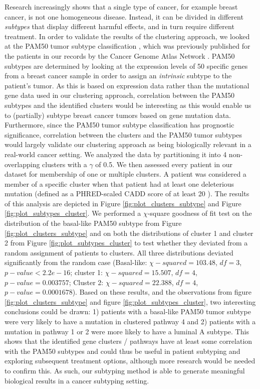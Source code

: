 \documentclass[conference]{IEEEtran}
\begin{document}
Research increasingly shows that a single type of cancer, for example breast cancer, is not one homogeneous disease. Instead, it can be divided in different \textit{subtypes} that display different harmful effects, and in turn require different treatment.
In order to validate the results of the clustering approach, we looked at the PAM50 tumor subtype classification \cite{parker2009supervised}, which was previously published for the patients in our records by the Cancer Genome Atlas Network \cite{cancer2012comprehensive}. PAM50 subtypes are determined by looking at the expression levels of 50 specific genes from a breast cancer sample in order to assign an \emph{intrinsic} subtype to the patient’s tumor. As this is based on expression data rather than the mutational gene data used in our clustering approach, correlation between the PAM50 subtypes and the identified clusters would be interesting as this would enable us to (partially) subtype breast cancer tumors based on gene mutation data. Furthermore, since the PAM50 tumor subtype classification has prognostic significance, correlation between the clusters and the PAM50 tumor subtypes would largely validate our clustering approach as being biologically relevant in a real-world cancer setting.
We analyzed the data by partitioning it into 4 non-overlapping clusters with a $\gamma$ of 0.5. We then assessed every patient in our dataset for membership of one or multiple clusters. A patient was considered a member of a specific cluster when that patient had at least one deleterious mutation (defined as a PHRED-scaled CADD score of at least 20 \cite{kircher2014general}). The results of this analysis are depicted in Figure \ref{fig:plot_clusters_subtype} and Figure \ref{fig:plot_subtypes_cluster}. We performed a $\chi$-square goodness of fit test on the distribution of the basal-like PAM50 subtype from Figure \ref{fig:plot_clusters_subtype} and on both the distributions of cluster 1 and cluster 2 from Figure \ref{fig:plot_subtypes_cluster} to test whether they deviated from a random assignment of patients to clusters. All three distributions deviated significantly from the random case (Basal-like: $\chi-squared = 103.48$, $df = 3$, $p-value < 2.2e-16$; cluster 1: $\chi-squared = 15.507$, $df = 4$, $p-value =0.003757$; Cluster 2: $\chi-squared = 22.388$, $df = 4$, $p-value = 0.0001678$).
Based on these results, and the observations from figure \ref{fig:plot_clusters_subtype} and figure \ref{fig:plot_subtypes_cluster}, two interesting conclusions could be drawn: 1) patients with a basal-like PAM50 tumor subtype were very likely to have a mutation in clustered pathway 4 and 2) patients with a mutation in pathway 1 or 2 were more likely to have a luminal A subtype. This shows that the identified gene clusters / pathways have at least some correlation with the PAM50 subtypes and could thus be useful in patient subtyping and exploring subsequent treatment options, although more research would be needed to confirm this. As such, our subtyping method is able to generate meaningful biological results in a cancer subtyping setting.
\end{document}
